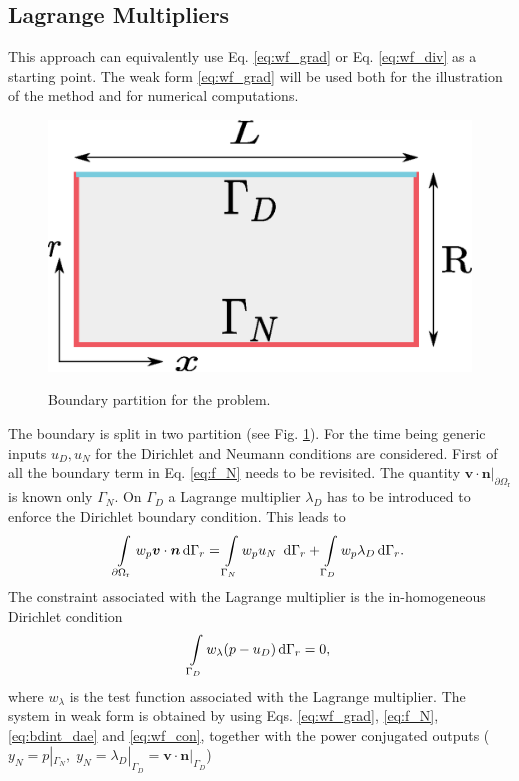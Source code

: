 \documentclass{ifacconf}
\begin{document}
\subsection{Lagrange Multipliers}
\label{sec:lgr_mul}
This approach can equivalently use Eq. \eqref{eq:wf_grad} or Eq. \eqref{eq:wf_div} as a starting point. The weak form \eqref{eq:wf_grad} will be used both for the illustration of the method and for numerical computations. 
\begin{figure}[t]%
	\centering
	\includegraphics[width=0.65\columnwidth]{boundary_part.eps} \\
	\caption[bcpart]{Boundary partition for the problem.}
	\label{fig:bc_part}
\end{figure}
The boundary is split in two partition (see Fig. \ref{fig:bc_part}). For the time being generic inputs $u_D, u_N$ for the Dirichlet and Neumann conditions are considered.  First of all the boundary term in Eq. \eqref{eq:f_N} needs to be revisited. The quantity $\bm{v}\cdot\bm{n}\vert_{\partial \Omega_{\text{r}}}$ is known only $\Gamma_N$. On $\Gamma_D$ a Lagrange multiplier $\lambda_D$ has to be introduced to enforce the Dirichlet boundary condition. This leads to 
\begin{equation}
\label{eq:bdint_dae}
\int_{\partial \Omega_{\text{r}}} w_p \bm{v} \cdot \bm{n} \d{\Gamma_r} = \int_{\Gamma_N} w_p u_N \ \d{\Gamma_r} + \int_{\Gamma_D} w_p \lambda_D \d{\Gamma_r}.
\end{equation}
The constraint associated with the Lagrange multiplier  is the in-homogeneous Dirichlet condition
\begin{equation}
\label{eq:wf_con}
\int_{\Gamma_D} w_\lambda (p - u_D) \d{\Gamma_r} = 0,
\end{equation}
where $w_\lambda$ is the test function associated with the Lagrange multiplier. The system in weak form is obtained by using Eqs. \eqref{eq:wf_grad}, \eqref{eq:f_N}, \eqref{eq:bdint_dae} and \eqref{eq:wf_con}, together with the power conjugated outputs ($y_N = p|_{\Gamma_N}, \; y_N = \lambda_D|_{\Gamma_D} = \bm{v} \cdot \bm{n}|_{\Gamma_D}$)
\end{document}
